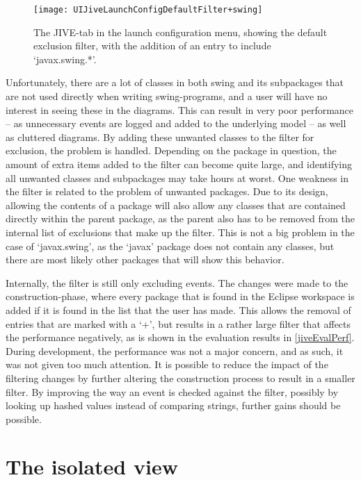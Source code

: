\begin{figure}[H]
	\centering
	\texttt{[image: UIJiveLaunchConfigDefaultFilter+swing]}
	\caption[The JIVE-tab in the launch configuration menu.]{The JIVE-tab in the launch configuration menu, showing the default exclusion filter, with the addition of an entry to include `javax.swing.*'.}
	\label{fig:UIJiveLaunchConfigDefaultFilter+swing}
\end{figure}

Unfortunately, there are a lot of classes in both swing and its subpackages that are not used directly when writing swing-programs, and a user will have no interest in seeing these in the diagrams.
This can result in very poor performance -- as unnecessary events are logged and added to the underlying model -- as well as cluttered diagrams.
By adding these unwanted classes to the filter for exclusion, the problem is handled.
Depending on the package in question, the amount of extra items added to the filter can become quite large, and identifying all unwanted classes and subpackages may take hours at worst.
One weakness in the filter is related to the problem of unwanted packages.
Due to its design, allowing the contents of a package will also allow any classes that are contained directly within the parent package, as the parent also has to be removed from the internal list of exclusions that make up the filter.
This is not a big problem in the case of `javax.swing', as the `javax' package does not contain any classes, but there are most likely other packages that will show this behavior.

Internally, the filter is still only excluding events.
The changes were made to the construction-phase, where every package that is found in the Eclipse workspace is added if it is found in the list that the user has made.
This allows the removal of entries that are marked with a `+', but results in a rather large filter that affects the performance negatively, as is shown in the evaluation results in \cref{jiveEvalPerf}.
During development, the performance was not a major concern, and as such, it was not given too much attention.
It is possible to reduce the impact of the filtering changes by further altering the construction process to result in a smaller filter.
By improving the way an event is checked against the filter, possibly by looking up hashed values instead of comparing strings, further gains should be possible.


\section{The isolated view}\label{isoView}

